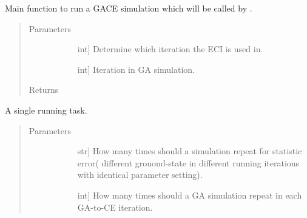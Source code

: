 \documentclass[letterpaper,10pt,english]{sphinxmanual}
\begin{document}
\begin{fulllineitems}
\begin{fulllineitems}
\label{\detokenize{pygace.examples.sto:pygace.examples.sto.sto_gace.STOApp.run}}
Main function to run a GACE simulation which will be called by
.
\begin{quote}\begin{description}
\item[{Parameters}] \leavevmode\begin{description}
\item[{}] \leavevmode{[}int{]}
Determine which iteration the ECI is used in.

\item[{}] \leavevmode{[}int{]}
Iteration in GA simulation.

\end{description}

\item[{Returns}] \leavevmode\begin{description}
\item[{}] \leavevmode
\end{description}

\end{description}\end{quote}

\end{fulllineitems}


\begin{fulllineitems}
\label{\detokenize{pygace.examples.sto:pygace.examples.sto.sto_gace.STOApp.single_run}}
A single running task.
\begin{quote}\begin{description}
\item[{Parameters}] \leavevmode\begin{description}
\item[{}] \leavevmode{[}str{]}
How many times should a simulation repeat for statistic error(
different grouond-state in different running iterations with
identical parameter setting).

\item[{}] \leavevmode{[}int{]}
How many times should a GA simulation repeat in each GA-to-CE
iteration.


\end{description}
\end{description}
\end{quote}
\end{fulllineitems}
\end{fulllineitems}
\end{document}
